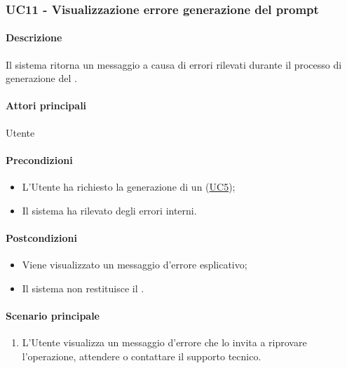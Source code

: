 \subsubsection{UC11 - Visualizzazione errore generazione del prompt}\label{UC11}
\paragraph*{Descrizione}
Il sistema ritorna un messaggio a causa di errori rilevati durante il processo di generazione del .

\paragraph*{Attori principali}
Utente

\paragraph*{Precondizioni}
\begin{itemize}
  \item L'Utente ha richiesto la generazione di un  (\hyperref[UC5]{UC5});
  \item Il sistema ha rilevato degli errori interni. 
\end{itemize}

\paragraph*{Postcondizioni}
\begin{itemize}
  \item Viene visualizzato un messaggio d'errore esplicativo;
  \item Il sistema non restituisce il .
\end{itemize}

\paragraph*{Scenario principale}
\begin{enumerate}
  \item L'Utente visualizza un messaggio d'errore che lo invita a riprovare l'operazione, attendere o contattare il supporto tecnico.
\end{enumerate}
